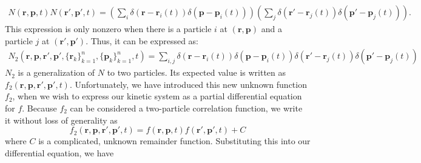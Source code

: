 \documentclass{article}
\begin{document}
\begin{align*}
N(\mathbf{r},\mathbf{p},t)N(\mathbf{r}',\mathbf{p}',t)=\left(\sum_i\delta(\mathbf{r}-\mathbf{r}_i(t))\delta(\mathbf{p}-\mathbf{p}_i(t))\right)\left(\sum_j\delta(\mathbf{r}'-\mathbf{r}_j(t))\delta(\mathbf{p}'-\mathbf{p}_j(t))\right).
\end{align*}This expression is only nonzero when there is a particle $i$ at $(\mathbf{r},\mathbf{p})$ and a particle $j$ at $(\mathbf{r}',\mathbf{p}')$. Thus, it can be expressed as:
\begin{align*}
N_2(\mathbf{r},\mathbf{p},\mathbf{r}',\mathbf{p}',\{\mathbf{r}_k\}_{k=1}^n,\{\mathbf{p}_k\}_{k=1}^n,t)=\sum_{i,j}\delta(\mathbf{r}-\mathbf{r}_i(t))\delta(\mathbf{p}-\mathbf{p}_i(t))\delta(\mathbf{r}'-\mathbf{r}_j(t))\delta(\mathbf{p}'-\mathbf{p}_j(t))
\end{align*}$N_2$ is a generalization of $N$ to two particles. Its expected value is written as $f_2(\mathbf{r},\mathbf{p},\mathbf{r}',\mathbf{p}',t)$. Unfortunately, we have introduced this new unknown function $f_2$, when we wish to express our kinetic system as a partial differential equation for $f$. Because $f_2$ can be considered a two-particle correlation function, we write it without loss of generality as
\begin{equation}f_2(\mathbf{r},\mathbf{p},\mathbf{r}',\mathbf{p}',t)=f(\mathbf{r},\mathbf{p},t)f(\mathbf{r}',\mathbf{p}',t)+C\label{f2}
\end{equation}where $C$ is a complicated, unknown remainder function. Substituting this into our differential equation, we have
\end{document}

